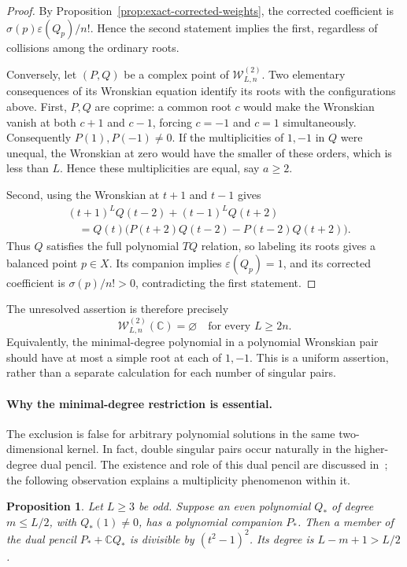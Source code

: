 \documentclass[11pt]{article}
\newtheorem{proposition}{Proposition}[section]
\theoremstyle{definition}
\newcommand{\C}{\mathbb C}
\begin{document}
\begin{proof}
By Proposition~\ref{prop:exact-corrected-weights}, the corrected
coefficient is $\sigma(p)\varepsilon(Q_p)/n!$. Hence the second
statement implies the first, regardless of collisions among the
ordinary roots.

Conversely, let $(P,Q)$ be a complex point of
$\mathcal W^{(2)}_{L,n}$. Two elementary consequences of its
Wronskian equation identify its roots with the configurations above.
First, $P,Q$ are coprime: a common root $c$ would make the
Wronskian vanish at both $c+1$ and $c-1$, forcing $c=-1$ and
$c=1$ simultaneously. Consequently $P(1),P(-1)\ne0$.
If the multiplicities of $1,-1$ in $Q$ were unequal, the
Wronskian at zero would have the smaller of these orders, which is
less than $L$. Hence these multiplicities are equal, say $a\ge2$.

Second, using the Wronskian at $t+1$ and $t-1$ gives
\[
 \begin{aligned}
 &(t+1)^LQ(t-2)+(t-1)^LQ(t+2)\\
 &\quad=Q(t)\bigl(P(t+2)Q(t-2)-P(t-2)Q(t+2)\bigr).
 \end{aligned}
\]
Thus $Q$ satisfies the full polynomial $TQ$ relation, so labeling
its roots gives a balanced point $p\in X$. Its companion implies
$\varepsilon(Q_p)=1$, and its corrected coefficient is
$\sigma(p)/n!>0$, contradicting the first statement.
\end{proof}

The unresolved assertion is therefore precisely
\[
 \boxed{\mathcal W^{(2)}_{L,n}(\C)=\varnothing
        \quad\text{for every }L\ge2n.}
\]
Equivalently, the minimal-degree polynomial in a polynomial
Wronskian pair should have at most a simple root at each of $1,-1$.
This is a uniform assertion, rather than a separate calculation for
each number of singular pairs.

\paragraph{Why the minimal-degree restriction is essential.}
The exclusion is false for arbitrary polynomial solutions in the same
two-dimensional kernel. In fact, double singular pairs occur naturally
in the higher-degree dual pencil. The existence and role of this dual
pencil are discussed in~\cite{PS1999}; the following observation
explains a multiplicity phenomenon within it.

\begin{proposition}\label{prop:dual-double-pairs}
Let $L\ge3$ be odd. Suppose an even polynomial $Q_*$ of degree
$m\le L/2$, with $Q_*(1)\ne0$, has a polynomial companion $P_*$.
Then a member of the dual pencil $P_*+\C Q_*$ is divisible by
$(t^2-1)^2$. Its degree is $L-m+1>L/2$.
\end{proposition}
\end{document}
